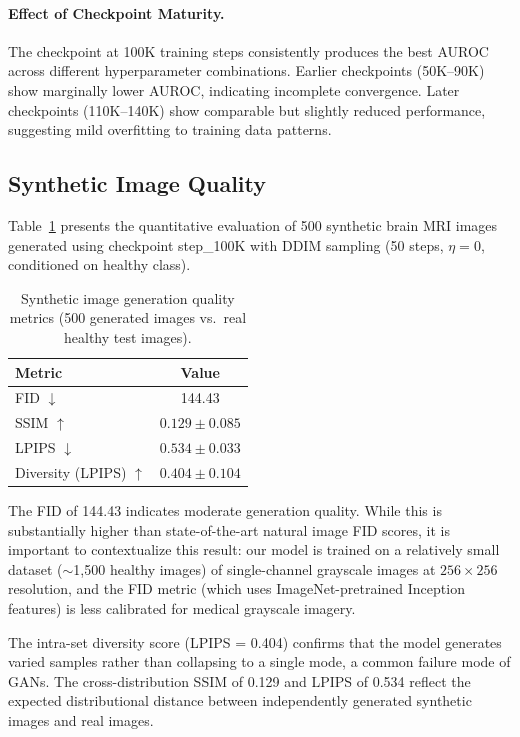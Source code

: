 \paragraph{Effect of Checkpoint Maturity.} The checkpoint at 100K training steps consistently produces the best AUROC across different hyperparameter combinations. Earlier checkpoints (50K--90K) show marginally lower AUROC, indicating incomplete convergence. Later checkpoints (110K--140K) show comparable but slightly reduced performance, suggesting mild overfitting to training data patterns.

\subsection{Synthetic Image Quality}
\label{sec:generation_results}

Table~\ref{tab:generation_metrics} presents the quantitative evaluation of 500 synthetic brain MRI images generated using checkpoint step\_100K with DDIM sampling (50 steps, $\eta = 0$, conditioned on healthy class).

\begin{table}[H]
\centering
\caption{Synthetic image generation quality metrics (500 generated images vs.\ real healthy test images).}
\label{tab:generation_metrics}
\begin{tabular}{@{}lc@{}}
\toprule
\textbf{Metric} & \textbf{Value} \\
\midrule
FID $\downarrow$                      & 144.43 \\
SSIM $\uparrow$                       & $0.129 \pm 0.085$ \\
LPIPS $\downarrow$                    & $0.534 \pm 0.033$ \\
Diversity (LPIPS) $\uparrow$          & $0.404 \pm 0.104$ \\
\bottomrule
\end{tabular}
\end{table}

The FID of 144.43 indicates moderate generation quality. While this is substantially higher than state-of-the-art natural image FID scores, it is important to contextualize this result: our model is trained on a relatively small dataset ($\sim$1,500 healthy images) of single-channel grayscale images at $256 \times 256$ resolution, and the FID metric (which uses ImageNet-pretrained Inception features) is less calibrated for medical grayscale imagery.

The intra-set diversity score (LPIPS = 0.404) confirms that the model generates varied samples rather than collapsing to a single mode, a common failure mode of GANs. The cross-distribution SSIM of 0.129 and LPIPS of 0.534 reflect the expected distributional distance between independently generated synthetic images and real images.

